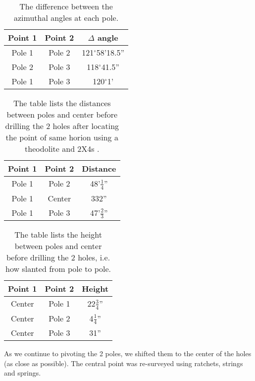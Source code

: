 \documentclass[12pt, letter]{article}
\begin{document}
\begin{table}[!h]
\centering
\begin{tabular}{|c|c|c|} \hline

Point 1 & Point 2 & $\Delta$ angle \\ \hline
Pole 1 & Pole 2 & 121$^\circ$58'18.5'' \\ \hline
Pole 2 & Pole 3 & 118$^\circ$41.5'' \\ \hline
Pole 1 & Pole 3 &  120$^\circ$1'\\ \hline

\end{tabular}
\caption{The difference between the azimuthal angles at each pole. \label{Tab:diff_az_poles}}
\end{table}



\begin{table}[!h]
\centering
\begin{tabular}{|c|c|c|} \hline

Point 1 & Point 2 & Distance \\ \hline
Pole 1 & Pole 2 & 48'$\frac{1}{4}$'' \\ \hline
Pole 1 & Center & 332'' \\ \hline
Pole 1 & Pole 3 & 47'$\frac{2}{3}$'' \\ \hline

\end{tabular}
\caption{The table lists the distances between poles and center before drilling the 2 holes after locating the point of same horion using a theodolite and 2X4s \label{Tab:survey_dist_b4_2holes}.}
\end{table}


\begin{table}[!h]
\centering
\begin{tabular}{|c|c|c|} \hline

Point 1 & Point 2 & Height \\ \hline
Center & Pole 1 & 22$\frac{3}{4}$'' \\ \hline
Center & Pole 2 & 4$\frac{1}{4}$'' \\ \hline
Center & Pole 3 & 31'' \\ \hline


\end{tabular}
\caption{The table lists the height between poles and center before drilling the 2 holes, i.e. how slanted from pole to pole\label{Tab:h_diff_pole}.}
\end{table}

As we continue to pivoting the 2 poles, we shifted them to the center of the holes (as close as possible). The central point was re-surveyed using ratchets, strings and springs. 
\end{document}
